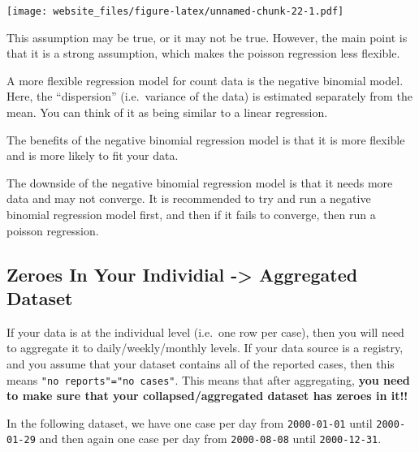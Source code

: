 \documentclass[]{book}
\newenvironment{Shaded}{\begin{snugshade}}{\end{snugshade}}
\newcommand{\KeywordTok}[1]{\textcolor[rgb]{0.13,0.29,0.53}{\textbf{#1}}}
\newcommand{\DataTypeTok}[1]{\textcolor[rgb]{0.13,0.29,0.53}{#1}}
\newcommand{\DecValTok}[1]{\textcolor[rgb]{0.00,0.00,0.81}{#1}}
\newcommand{\StringTok}[1]{\textcolor[rgb]{0.31,0.60,0.02}{#1}}
\newcommand{\OperatorTok}[1]{\textcolor[rgb]{0.81,0.36,0.00}{\textbf{#1}}}
\newcommand{\ErrorTok}[1]{\textcolor[rgb]{0.64,0.00,0.00}{\textbf{#1}}}
\newcommand{\NormalTok}[1]{#1}
\begin{document}
\texttt{[image: website\_files/figure-latex/unnamed-chunk-22-1.pdf]}

This assumption may be true, or it may not be true. However, the main
point is that it is a strong assumption, which makes the poisson
regression less flexible.

A more flexible regression model for count data is the negative binomial
model. Here, the ``dispersion'' (i.e.~variance of the data) is estimated
separately from the mean. You can think of it as being similar to a
linear regression.

The benefits of the negative binomial regression model is that it is
more flexible and is more likely to fit your data.

The downside of the negative binomial regression model is that it needs
more data and may not converge. It is recommended to try and run a
negative binomial regression model first, and then if it fails to
converge, then run a poisson regression.

\subsection{Zeroes In Your Individial -\textgreater{} Aggregated
Dataset}\label{zeroes-in-your-individial---aggregated-dataset}

If your data is at the individual level (i.e.~one row per case), then
you will need to aggregate it to daily/weekly/monthly levels. If your
data source is a registry, and you assume that your dataset contains all
of the reported cases, then this means
\texttt{"no\ reports"="no\ cases"}. This means that after aggregating,
\textbf{you need to make sure that your collapsed/aggregated dataset has
zeroes in it!!}

In the following dataset, we have one case per day from
\texttt{2000-01-01} until \texttt{2000-01-29} and then again one case
per day from \texttt{2000-08-08} until \texttt{2000-12-31}.

\begin{Shaded}
\end{Shaded}
\end{document}
